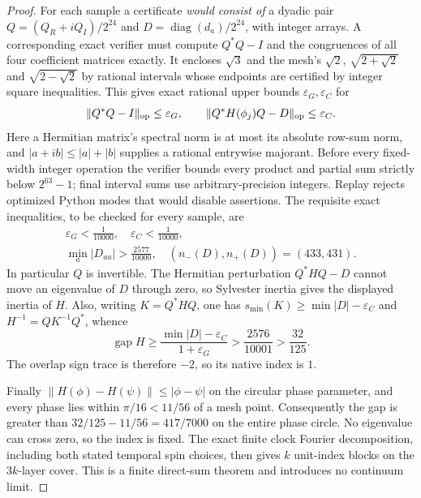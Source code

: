 \documentclass[12pt,a4paper]{article}
\begin{document}
\begin{proof}
For each sample a certificate \emph{would consist of} a dyadic pair
$Q=(Q_R+iQ_I)/2^{24}$ and
$D=\operatorname{diag}(d_a)/2^{24}$, with integer arrays.
A corresponding exact verifier must compute $Q^*Q-I$ and the congruences of all four
coefficient matrices exactly. It encloses $\sqrt3$ and the mesh's
$\sqrt2$, $\sqrt{2+\sqrt2}$ and $\sqrt{2-\sqrt2}$ by rational
intervals whose endpoints are certified by integer square inequalities.
This gives exact rational upper bounds $\varepsilon_G,\varepsilon_C$
for
\[
 \|Q^*Q-I\|_{\rm op}\le\varepsilon_G,\qquad
 \|Q^*H(\phi_j)Q-D\|_{\rm op}\le\varepsilon_C.
\]
Here a Hermitian matrix's spectral norm is at most its absolute row-sum
norm, and $|a+ib|\le|a|+|b|$ supplies a rational entrywise majorant.
Before every fixed-width integer operation the verifier bounds every
product and partial sum strictly below $2^{63}-1$; final interval sums
use arbitrary-precision integers. Replay rejects optimized Python modes
that would disable assertions. The requisite exact inequalities, to be checked for every sample, are
\begin{equation}
 \begin{gathered}
 \varepsilon_G<\frac1{10000},\quad
 \varepsilon_C<\frac1{10000},\\
 \min_a|D_{aa}|>\frac{2577}{10000},\quad
 (n_-(D),n_+(D))=(433,431).
 \end{gathered}
 \label{p10:eq:v256-exact-certificate-inequalities}
\end{equation}
In particular $Q$ is invertible. The Hermitian perturbation
$Q^*HQ-D$ cannot move an eigenvalue of $D$ through zero, so Sylvester
inertia gives the displayed inertia of $H$.
Also, writing $K=Q^*HQ$, one has
$s_{\min}(K)\ge\min|D|-\varepsilon_C$ and
$H^{-1}=QK^{-1}Q^*$, whence
\[
 \operatorname{gap}H\ge
 \frac{\min|D|-\varepsilon_C}{1+\varepsilon_G}
 >\frac{2576}{10001}>\frac{32}{125}.
\]
The overlap sign trace is therefore $-2$, so its native index is $1$.

Finally $\|H(\phi)-H(\psi)\|\le|\phi-\psi|$ on the circular phase
parameter, and every phase lies within $\pi/16<11/56$ of a mesh point.
Consequently the gap is greater than
$32/125-11/56=417/7000$ on the entire phase circle.
No eigenvalue can cross zero, so the index is fixed. The exact finite
clock Fourier decomposition, including both stated temporal spin choices,
then gives $k$ unit-index blocks on the $3k$-layer cover. This is a
finite direct-sum theorem and introduces no continuum limit.
\end{proof}
\end{document}
